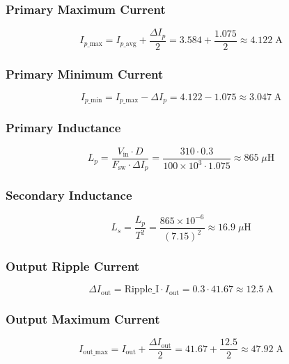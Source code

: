 \subsubsection*{Primary Maximum Current}
\begin{equation}
I_{p\_\text{max}} = I_{p\_\text{avg}} + \frac{\Delta I_p}{2} = 3.584 + \frac{1.075}{2} \approx \boxed{4.122\;\text{A}}
\end{equation}

\subsubsection*{Primary Minimum Current}
\begin{equation}
I_{p\_\text{min}} = I_{p\_\text{max}} - \Delta I_p = 4.122 - 1.075 \approx \boxed{3.047\;\text{A}}
\end{equation}

\subsubsection*{Primary Inductance}
\begin{equation}
L_p = \frac{V_{\text{in}} \cdot D}{F_{\text{sw}} \cdot \Delta I_p} = \frac{310 \cdot 0.3}{100 \times 10^3 \cdot 1.075} \approx \boxed{865\;\mu\text{H}}
\end{equation}

\subsubsection*{Secondary Inductance}
\begin{equation}
L_s = \frac{L_p}{T^2} = \frac{865 \times 10^{-6}}{(7.15)^2} \approx \boxed{16.9\;\mu\text{H}}
\end{equation}

\subsubsection*{Output Ripple Current}
\begin{equation}
\Delta I_{\text{out}} = \text{Ripple\_I} \cdot I_{\text{out}} = 0.3 \cdot 41.67 \approx \boxed{12.5\;\text{A}}
\end{equation}

\subsubsection*{Output Maximum Current}
\begin{equation}
I_{\text{out\_max}} = I_{\text{out}} + \frac{\Delta I_{\text{out}}}{2} = 41.67 + \frac{12.5}{2} \approx \boxed{47.92\;\text{A}}
\end{equation}

